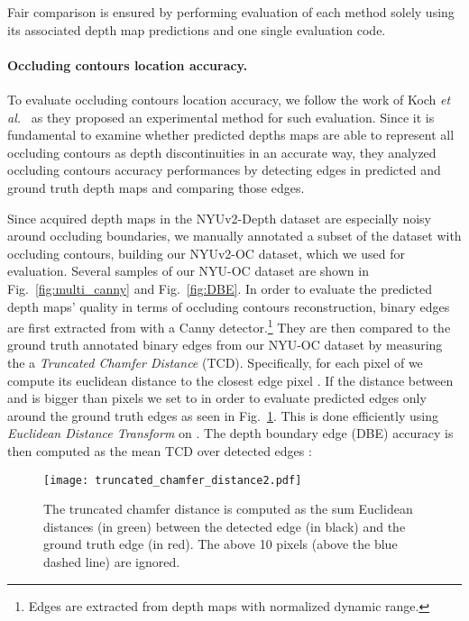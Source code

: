 \documentclass[10pt,twocolumn,letterpaper]{article}
\begin{document}
Fair comparison is ensured by performing evaluation of each method solely using 
its associated depth map predictions and one single evaluation code.

\paragraph{Occluding contours location accuracy.}

To evaluate occluding contours location accuracy, we follow the work 
of Koch \textit{et al.}~\cite{Koch2018EvaluationOC} as they proposed an 
experimental method for such evaluation. Since it is fundamental to examine 
whether predicted depths maps are able to represent all occluding contours as 
depth discontinuities in an accurate way, they analyzed occluding contours 
accuracy performances by detecting edges in predicted and ground 
truth depth maps and comparing those edges.

Since acquired depth maps in the NYUv2-Depth dataset are especially noisy 
around occluding boundaries, we manually annotated a subset of the dataset with 
occluding contours, building our NYUv2-OC dataset, which we used for 
evaluation. Several samples of our NYU-OC dataset are shown in 
Fig.~\ref{fig:multi_canny} and Fig.~\ref{fig:DBE}. In order to evaluate the 
predicted depth maps'  quality in terms of occluding contours 
reconstruction, binary edges  are first extracted 
from  with a Canny detector.\footnote{Edges are extracted from 
depth maps with normalized dynamic range.} They are then compared to the ground 
truth annotated binary edges  from our NYU-OC dataset by 
measuring the a \textit{Truncated Chamfer Distance} (TCD).
Specifically, for each pixel  of  we 
compute its euclidean distance  to the closest edge pixel 
. If the distance between  and  
is bigger than  pixels we set  to  in order to evaluate predicted 
edges only around the ground truth edges as seen in 
Fig.~\ref{fig:dbe_acc_computation}. This is done efficiently using 
\textit{Euclidean Distance Transform} on .
The depth boundary edge (DBE) accuracy is then computed as the mean TCD over 
detected edges : 



\begin{figure}[t]		
	\begin{center}
		\texttt{[image: truncated\_chamfer\_distance2.pdf]}
	\end{center}	
	\caption{The truncated chamfer distance is computed as the sum Euclidean distances  (in green) between the detected 
	edge  (in black) and the ground truth edge  (in 
	red). The  above 10 pixels (above the blue dashed line) are ignored.}
	\label{fig:dbe_acc_computation}
\end{figure}
\end{document}
